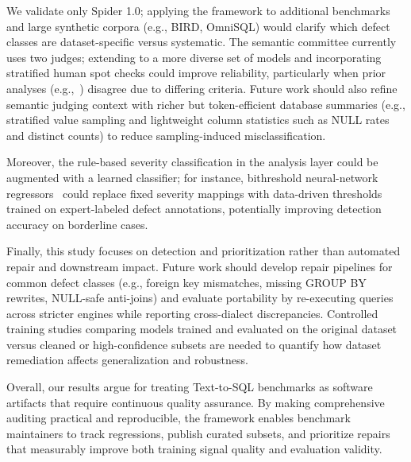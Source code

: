 \documentclass[print]{einformatica}
\begin{document}
We validate only Spider 1.0; applying the framework to additional benchmarks and large synthetic corpora (e.g., BIRD, OmniSQL) would clarify which defect classes are dataset-specific versus systematic. The semantic committee currently uses two judges; extending to a more diverse set of models and incorporating stratified human spot checks could improve reliability, particularly when prior analyses (e.g.,~\cite{liu2025nl2sqlbugs}) disagree due to differing criteria. Future work should also refine semantic judging context with richer but token-efficient database summaries (e.g., stratified value sampling and lightweight column statistics such as NULL rates and distinct counts) to reduce sampling-induced misclassification.

Moreover, the rule-based severity classification in the analysis layer could be augmented with a learned classifier; for instance, bithreshold neural-network regressors~\cite{kotsovsky2024bithreshold} could replace fixed severity mappings with data-driven thresholds trained on expert-labeled defect annotations, potentially improving detection accuracy on borderline cases.

Finally, this study focuses on detection and prioritization rather than automated repair and downstream impact. Future work should develop repair pipelines for common defect classes (e.g., foreign key mismatches, missing GROUP BY rewrites, NULL-safe anti-joins) and evaluate portability by re-executing queries across stricter engines while reporting cross-dialect discrepancies. Controlled training studies comparing models trained and evaluated on the original dataset versus cleaned or high-confidence subsets are needed to quantify how dataset remediation affects generalization and robustness.

Overall, our results argue for treating Text-to-SQL benchmarks as software artifacts that require continuous quality assurance. By making comprehensive auditing practical and reproducible, the framework enables benchmark maintainers to track regressions, publish curated subsets, and prioritize repairs that measurably improve both training signal quality and evaluation validity.


\end{document}
